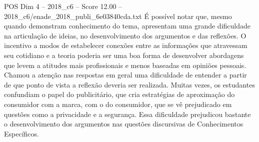 \begin{textsample}{POS Dim 4 – 2018\_c6 – Score 12.00 – 2018\_c6/enade\_2018\_publi\_6e03840cda.txt}
É possível notar que, mesmo quando demonstram conhecimento do tema, apresentam uma grande dificuldade na articulação de ideias, no desenvolvimento dos argumentos e das reflexões.
O incentivo a modos de estabelecer conexões entre as informações que atravessam seu cotidiano e a teoria poderia ser uma boa forma de desenvolver abordagens que levem a atitudes mais profissionais e menos baseadas em opiniões pessoais.
Chamou a atenção nas respostas em geral uma dificuldade de entender a partir de que ponto de vista a reflexão deveria ser realizada.
Muitas vezes, os estudantes confundiam o papel do publicitário, que cria estratégias de aproximação do consumidor com a marca, com o do consumidor, que se vê prejudicado em questões como a privacidade e a segurança.
Essa dificuldade prejudicou bastante o desenvolvimento dos argumentos nas questões discursivas de Conhecimentos Específicos.

\end{textsample}
